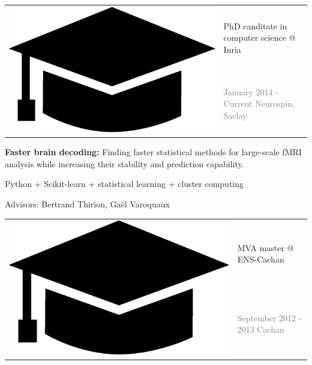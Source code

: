 \documentclass[letterpaper]{article}
\begin{document}
\begin{minipage}[t]{1.\linewidth}
\begin{minipage}{0.47\linewidth}
{\begin{minipage}{1\linewidth}
\end{minipage} %
}%
\end{minipage}
% 
%
%
\hfill
\begin{minipage}{0.47\linewidth}
	\begin{minipage}{1\linewidth}
	\end{minipage}
	\begin{minipage}{1\linewidth} %
		\vspace{4ex}
		\begin{tabularx}{1\textwidth}{rX}				
			\multirow{2}{*}{\includegraphics[trim= 0.1cm 0.1cm 0.1cm 0.1cm,	
			clip=true, width=0.12\linewidth]{hat.eps}} & {\large PhD canditate 
			in computer science @ Inria}\\
			& {\small\textcolor{gray}{January 2014 - Current \hfill Neurospin, 
			Saclay}}\\
		\end{tabularx}
		\vspace{0.1cm}
		
		{\small\textbf{Faster brain decoding:} Finding faster statistical 
		methods for large-scale fMRI analysis while increasing their stability 
		and prediction capability.
		
		\smallskip
		Python + Scikit-learn + statistical learning + cluster computing
		
		\smallskip
		\textmd{Advisors:} Bertrand Thirion, Ga{\"e}l Varoquaux}
	\end{minipage} %
	\begin{minipage}{1\linewidth} %
		\vspace{4ex}
		\begin{tabularx}{1\textwidth}{rX}				
			\multirow{2}{*}{\includegraphics[trim= 0.1cm 0.1cm 0.1cm 0.1cm, 
			clip=true, width=0.12\linewidth]{hat.eps}} & 
			{\large MVA master @ ENS-Cachan}\\
			& {\small\textcolor{gray}{September 2012 - 2013 \hfill Cachan}}\\
		\end{tabularx}
		\vspace{0.1cm}
		

\end{minipage}
\end{minipage}
\end{minipage}
\end{document}
